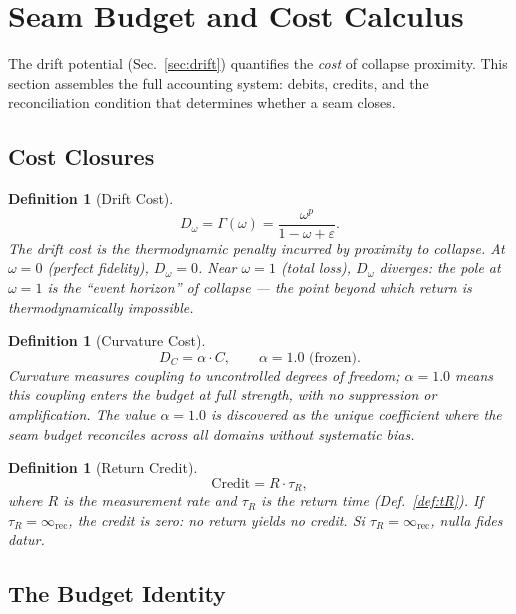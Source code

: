 \documentclass[
  aps,
  prd,
  preprint,
  superscriptaddress,
  nofootinbib,
  floatfix,
  longbibliography
]{revtex4-2}
\newtheorem{definition}[theorem]{Definition}
\newcommand{\tR}{\tau_{\!R}}
\newcommand{\Gam}{\Gamma}
\newcommand{\eps}{\varepsilon}
\newcommand{\beq}{\begin{equation}}
\newcommand{\eeq}{\end{equation}}
\newcommand{\Drft}{\omega}
\newcommand{\Curv}{C}
\newcommand{\lat}[1]{\textit{#1}}
\begin{document}
\section{Seam Budget and Cost Calculus}\label{sec:budget}

The drift potential (Sec.~\ref{sec:drift}) quantifies the
\emph{cost} of collapse proximity.
This section assembles the full accounting system:
debits, credits, and the reconciliation condition that
determines whether a seam closes.

\subsection{Cost Closures}

\begin{definition}[Drift Cost]\label{def:Domega}
\beq
  D_\Drft = \Gam(\Drft) = \frac{\Drft^p}{1 - \Drft + \eps}.
\eeq
The drift cost is the thermodynamic penalty incurred by
proximity to collapse.
At $\Drft = 0$ (perfect fidelity), $D_\Drft = 0$.
Near $\Drft = 1$ (total loss), $D_\Drft$ diverges:
the pole at $\Drft = 1$ is the ``event horizon'' of collapse
— the point beyond which return is thermodynamically
impossible.
\end{definition}

\begin{definition}[Curvature Cost]\label{def:DC}
\beq
  D_\Curv = \alpha \cdot \Curv, \qquad \alpha = 1.0 \text{ (frozen)}.
\eeq
Curvature measures coupling to uncontrolled degrees of
freedom; $\alpha = 1.0$ means this coupling enters the
budget at full strength, with no suppression or amplification.
The value $\alpha = 1.0$ is discovered as the unique
coefficient where the seam budget reconciles across all
domains without systematic bias.
\end{definition}

\begin{definition}[Return Credit]\label{def:credit}
\beq
  \mathrm{Credit} = R \cdot \tR,
\eeq
where $R$ is the measurement rate and $\tR$ is the return
time (Def.~\ref{def:tR}).
If $\tR = \infty_{\mathrm{rec}}$, the credit is zero:
no return yields no credit.
\lat{Si $\tR = \infty_{\mathrm{rec}}$, nulla fides datur.}
\end{definition}

\subsection{The Budget Identity}
\end{document}
